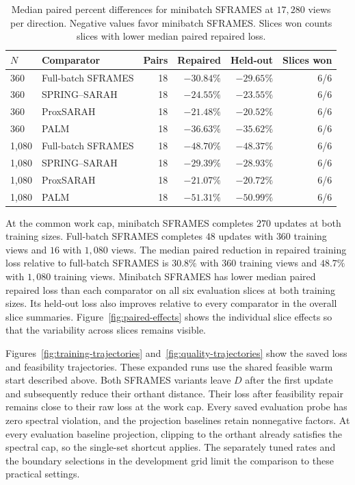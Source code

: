 \documentclass[11pt]{article}
\begin{document}
\clearpage
\begin{table}[!htbp]
\centering
\caption{Median paired percent differences for minibatch SFRAMES at \(17{,}280\) views per direction. Negative values favor minibatch SFRAMES. Slices won counts slices with lower median paired repaired loss.}
\label{tab:paired}
\small
\setlength{\tabcolsep}{4pt}
\begin{tabular}{@{}llrrrr@{}}
\toprule
$N$ & Comparator & Pairs & Repaired & Held-out & Slices won \\
\midrule
360 & Full-batch SFRAMES & 18 & $-30.84\%$ & $-29.65\%$ & 6/6 \\
360 & SPRING--SARAH & 18 & $-24.55\%$ & $-23.55\%$ & 6/6 \\
360 & ProxSARAH & 18 & $-21.48\%$ & $-20.52\%$ & 6/6 \\
360 & PALM & 18 & $-36.63\%$ & $-35.62\%$ & 6/6 \\
1{,}080 & Full-batch SFRAMES & 18 & $-48.70\%$ & $-48.37\%$ & 6/6 \\
1{,}080 & SPRING--SARAH & 18 & $-29.39\%$ & $-28.93\%$ & 6/6 \\
1{,}080 & ProxSARAH & 18 & $-21.07\%$ & $-20.72\%$ & 6/6 \\
1{,}080 & PALM & 18 & $-51.31\%$ & $-50.99\%$ & 6/6 \\
\bottomrule
\end{tabular}
\end{table}

At the common work cap, minibatch SFRAMES completes \(270\) updates at both
training sizes. Full-batch SFRAMES completes \(48\) updates with \(360\)
training views and \(16\) with \(1{,}080\) views. The median paired reduction
in repaired training loss relative to full-batch SFRAMES is
\(30.8\%\) with \(360\) training views and \(48.7\%\) with \(1{,}080\) training views.
Minibatch SFRAMES has lower median paired repaired loss than each comparator
on all six evaluation slices at both training sizes. Its held-out loss also
improves relative to every comparator in the overall slice summaries.
Figure~\ref{fig:paired-effects} shows the individual slice effects so that
the variability across slices remains visible.

Figures~\ref{fig:training-trajectories} and~\ref{fig:quality-trajectories}
show the saved loss and feasibility trajectories. These expanded runs use
the shared feasible warm start described above. Both SFRAMES variants leave
\(D\) after the first update and subsequently reduce their orthant distance.
Their loss after feasibility repair remains close to their raw loss at the
work cap. Every saved evaluation probe has zero spectral violation, and the
projection baselines retain nonnegative factors. At every evaluation baseline
projection, clipping to the orthant already satisfies the spectral cap, so
the single-set shortcut applies. The separately
tuned rates and the boundary selections in the development grid limit the
comparison to these practical settings.
\end{document}
